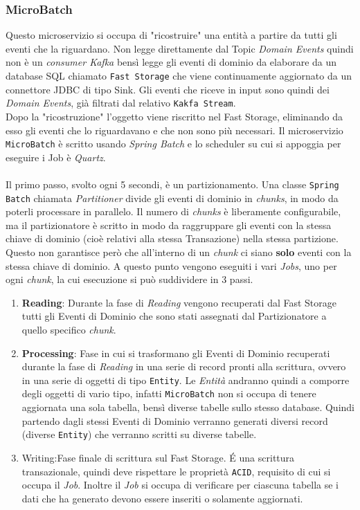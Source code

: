 \subsubsection{MicroBatch}
\label{subsubsec:micro_batch}
Questo microservizio si occupa di "ricostruire" una entità a partire da tutti gli eventi che la riguardano. 
Non legge direttamente dal Topic \textit{Domain Events} quindi non è un \textit{consumer Kafka} bensì legge gli eventi di dominio da elaborare da un database SQL chiamato \texttt{Fast Storage} che viene continuamente aggiornato da un connettore JDBC di tipo Sink.
Gli eventi che riceve in input sono quindi dei \textit{Domain Events}, già filtrati dal relativo \texttt{Kakfa Stream}.\\
Dopo la "ricostruzione" l'oggetto viene riscritto nel Fast Storage, eliminando da esso gli eventi che lo riguardavano e che non sono più necessari.
Il microservizio \texttt{MicroBatch} è scritto usando \textit{Spring Batch} e lo scheduler su cui si appoggia per eseguire i Job è \textit{Quartz}.\\\\
Il primo passo, svolto ogni 5 secondi, è un partizionamento. Una classe \texttt{Spring Batch} chiamata \textit{Partitioner} divide gli eventi di dominio in \textit{chunks}, in modo da poterli processare in parallelo.
Il numero di \textit{chunks} è liberamente configurabile, ma il partizionatore è scritto in modo da raggruppare gli eventi con la stessa chiave di dominio (cioè relativi alla stessa Transazione) nella stessa partizione.
Questo non garantisce però che all'interno di un \textit{chunk} ci siano \textbf{solo} eventi con la stessa chiave di dominio.
A questo punto vengono eseguiti i vari \textit{Jobs}, uno per ogni \textit{chunk}, la cui esecuzione si può suddividere in 3 passi.
\begin{enumerate}
    \item \textbf{Reading}: Durante la fase di \textit{Reading} vengono recuperati dal Fast Storage tutti gli Eventi di Dominio che sono stati assegnati dal Partizionatore a quello specifico \textit{chunk}.
    \item \textbf{Processing}: Fase in cui si trasformano gli Eventi di Dominio recuperati durante la fase di \textit{Reading} in una serie di record pronti alla scrittura, ovvero in una serie di oggetti di tipo \texttt{Entity}.
    Le \textit{Entità} andranno quindi a comporre degli oggetti di vario tipo, infatti \texttt{MicroBatch} non si occupa di tenere aggiornata una sola tabella, bensì diverse tabelle sullo stesso database. 
    Quindi partendo dagli stessi Eventi di Dominio verranno generati diversi record (diverse \texttt{Entity}) che verranno scritti su diverse tabelle.
    \item Writing:Fase finale di scrittura sul Fast Storage. É una scrittura transazionale, quindi deve rispettare le proprietà \texttt{ACID}, requisito di cui si occupa il \textit{Job}.
    Inoltre il \textit{Job} si occupa di verificare per ciascuna tabella se i dati che ha generato devono essere inseriti o solamente aggiornati.
\end{enumerate}

